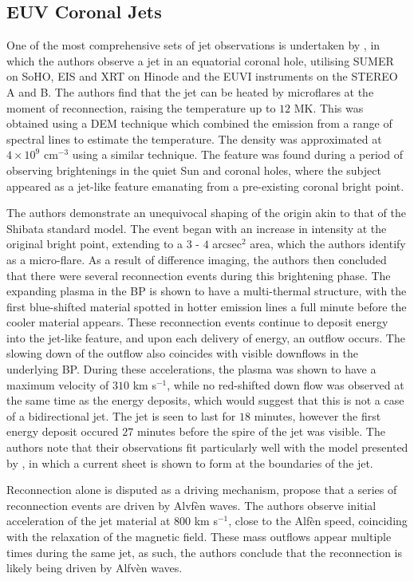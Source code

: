 \subsection{EUV Coronal Jets}
One of the most comprehensive sets of jet observations is undertaken by \cite{Majarska2011}, in which the authors observe a jet in an equatorial coronal hole, utilising SUMER on SoHO, EIS and XRT on Hinode and the EUVI instruments on the STEREO A and B.
The authors find that the jet can be heated by microflares at the moment of reconnection, raising the temperature up to $12$ MK.
This was obtained using a DEM technique which combined the emission from a range of spectral lines to estimate the temperature.
The density was approximated at $4 \times 10^9$ cm$^{-3}$ using a similar technique.
The feature was found during a period of observing brightenings in the quiet Sun and coronal holes, where the subject appeared as a jet-like feature emanating from a pre-existing coronal bright point.

The authors demonstrate an unequivocal shaping of the origin akin to that of the Shibata standard model.
The event began with an increase in intensity at the original bright point, extending to a $3$ - $4$ arcsec$^2$ area, which the authors identify as a micro-flare.
As a result of difference imaging, the authors then concluded that there were several reconnection events during this brightening phase.
The expanding plasma in the BP is shown to have a multi-thermal structure, with the first blue-shifted material spotted in hotter emission lines a full minute before the cooler material appears.
These reconnection events continue to deposit energy into the jet-like feature, and upon each delivery of energy, an outflow occurs.
The slowing down of the outflow also coincides with visible downflows in the underlying BP.
During these accelerations, the plasma was shown to have a maximum velocity of $310$ km s$^{-1}$, while no red-shifted down flow was observed at the same time as the energy deposits, which would suggest that this is not a case of a bidirectional jet.
The jet is seen to last for $18$ minutes, however the first energy deposit occured $27$ minutes before the spire of the jet was visible.
The authors note that their observations fit particularly well with the model presented by \cite{Moreno2008}, in which a current sheet is shown to form at the boundaries of the jet.

Reconnection alone is disputed as a driving mechanism, \cite{Cirtain2007} propose that a series of reconnection events are driven by Alvf{\`e}n waves.
The authors observe initial acceleration of the jet material at $800$ km s$^{-1}$, close to the Alf{\`e}n speed, coinciding with the relaxation of the magnetic field.
These mass outflows appear multiple times during the same jet, as such, the authors conclude that the reconnection is likely being driven by Alfv{\`e}n waves.

